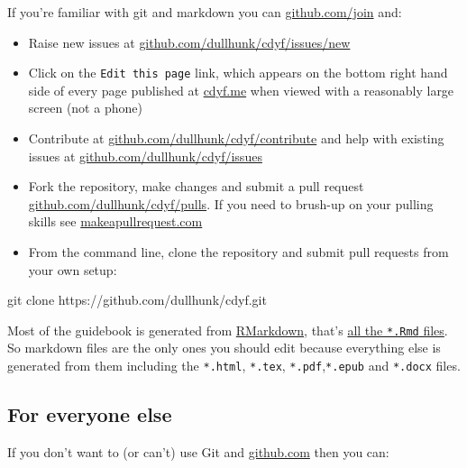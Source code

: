 \documentclass[
]{book}
\newenvironment{Shaded}{\begin{snugshade}}{\end{snugshade}}
\newcommand{\NormalTok}[1]{#1}
\providecommand{\tightlist}{%
  \setlength{\itemsep}{0pt}\setlength{\parskip}{0pt}}
\begin{document}
If you're familiar with git and markdown you can \href{https://github.com/join}{github.com/join} and:

\begin{itemize}
\tightlist
\item
  Raise new issues at \href{https://github.com/dullhunk/cdyf/issues/new}{github.com/dullhunk/cdyf/issues/new}
\item
  Click on the \texttt{Edit\ this\ page} link, which appears on the bottom right hand side of every page published at \href{https://www.cdyf.me}{cdyf.me} when viewed with a reasonably large screen (not a phone)
\item
  Contribute at \href{https://github.com/dullhunk/cdyf/contribute}{github.com/dullhunk/cdyf/contribute} and help with existing issues at \href{https://github.com/dullhunk/cdyf/issues}{github.com/dullhunk/cdyf/issues}
\item
  Fork the repository, make changes and submit a pull request \href{https://github.com/dullhunk/cdyf/pulls}{github.com/dullhunk/cdyf/pulls}. If you need to brush-up on your pulling skills see \href{http://makeapullrequest.com/}{makeapullrequest.com}
\item
  From the command line, clone the repository and submit pull requests from your own setup:
\end{itemize}

\begin{Shaded}
\begin{Highlighting}[]
\NormalTok{git clone https://github.com/dullhunk/cdyf.git}
\end{Highlighting}
\end{Shaded}

Most of the guidebook is generated from \href{https://en.wikipedia.org/wiki/Markdown}{RMarkdown}, that's \href{https://github.com/dullhunk/cdyf/search?l=RMarkdown}{all the \texttt{*.Rmd} files}. So markdown files are the only ones you should edit because everything else is generated from them including the \texttt{*.html}, \texttt{*.tex}, \texttt{*.pdf},\texttt{*.epub} and \texttt{*.docx} files.

\hypertarget{elseif}{%
\subsection{For everyone else}\label{elseif}}

If you don't want to (or can't) use Git and \href{https://github.com/}{github.com} then you can:
\end{document}
